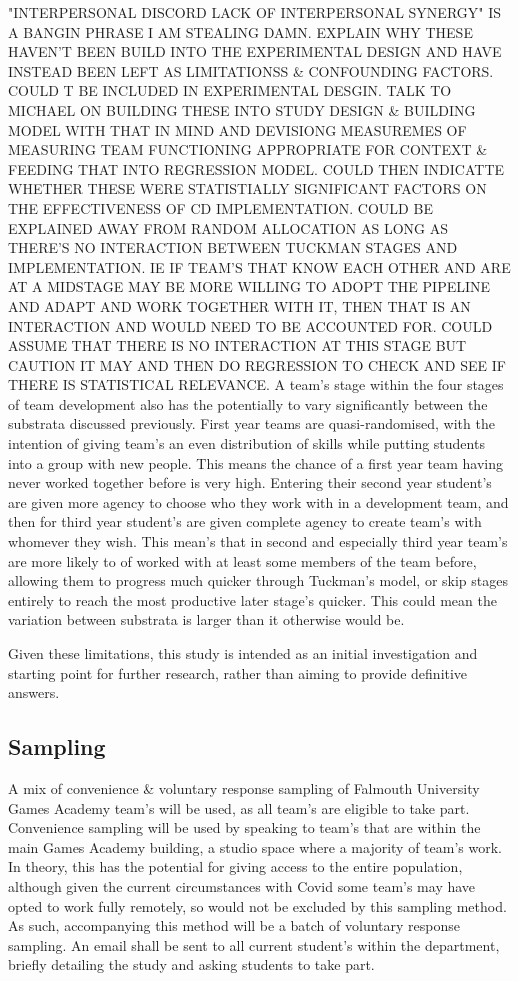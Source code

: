 \documentclass[journal]{IEEEtran}
\begin{document}
"INTERPERSONAL DISCORD\/ LACK OF INTERPERSONAL SYNERGY" IS A BANGIN PHRASE I AM STEALING DAMN. EXPLAIN WHY THESE HAVEN'T BEEN BUILD INTO THE EXPERIMENTAL DESIGN AND HAVE INSTEAD BEEN LEFT AS LIMITATIONSS \& CONFOUNDING FACTORS. COULD T BE INCLUDED IN EXPERIMENTAL DESGIN. TALK TO MICHAEL ON BUILDING THESE INTO STUDY DESIGN \& BUILDING MODEL WITH THAT IN MIND AND DEVISIONG MEASUREMES OF MEASURING TEAM FUNCTIONING APPROPRIATE FOR CONTEXT \& FEEDING THAT INTO REGRESSION MODEL. COULD THEN INDICATTE WHETHER THESE WERE STATISTIALLY SIGNIFICANT FACTORS ON THE EFFECTIVENESS OF CD IMPLEMENTATION. COULD BE EXPLAINED AWAY FROM RANDOM ALLOCATION AS LONG AS THERE'S NO INTERACTION BETWEEN TUCKMAN STAGES AND IMPLEMENTATION. IE IF TEAM'S THAT KNOW EACH OTHER AND ARE AT A MIDSTAGE MAY BE MORE WILLING TO ADOPT THE PIPELINE AND ADAPT AND WORK TOGETHER WITH IT, THEN THAT IS AN INTERACTION AND WOULD NEED TO BE ACCOUNTED FOR. COULD ASSUME THAT THERE IS NO INTERACTION AT THIS STAGE BUT CAUTION IT MAY AND THEN DO REGRESSION TO CHECK AND SEE IF THERE IS STATISTICAL RELEVANCE.
A team's stage within the four stages of team development\cite{tuckman1965developmental} also has the potentially to vary significantly between the substrata discussed previously. First year teams are quasi-randomised, with the intention of giving team's an even distribution of skills while putting students into a group with new people. This means the chance of a first year team having never worked together before is very high. Entering their second year student's are given more agency to choose who they work with in a development team, and then for third year student's are given complete agency to create team's with whomever they wish. This mean's that in second and especially third year team's are more likely to of worked with at least some members of the team before, allowing them to progress much quicker through Tuckman's model, or skip stages entirely to reach the most productive later stage's quicker. This could mean the variation between substrata is larger than it otherwise would be.

Given these limitations, this study is intended as an initial investigation and starting point for further research, rather than aiming to provide definitive answers.

\subsection{Sampling}
A mix of convenience \& voluntary response sampling of Falmouth University Games Academy team's will be used, as all team's are eligible to take part. Convenience sampling will be used by speaking to team's that are within the main Games Academy building, a studio space where a majority of team's work. In theory, this has the potential for giving access to the entire population, although given the current circumstances with Covid\cite{bbcomicron} some team's may have opted to work fully remotely, so would not be excluded by this sampling method.\\
As such, accompanying this method will be a batch of voluntary response sampling. An email shall be sent to all current student's within the department, briefly detailing the study and asking students to take part.
\end{document}
